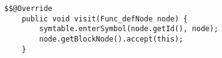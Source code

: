 \begin{lstlisting}[caption={Visit method for FuncDefNode in FuncStructureVisitor}, label={FuncDefNode}]
    $$@Override
    public void visit(Func_defNode node) {
        symtable.enterSymbol(node.getId(), node);
        node.getBlockNode().accept(this);
    }
\end{lstlisting}